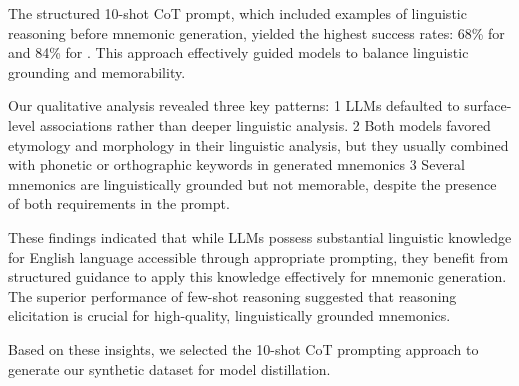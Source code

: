 The structured 10-shot CoT prompt, which included examples of linguistic reasoning before mnemonic generation, yielded the highest success rates: 68\% for \xteachermodel and 84\% for \teachermodel. This approach effectively guided models to balance linguistic grounding and memorability.

Our qualitative analysis revealed three key patterns: \numlist{1} LLMs defaulted to surface-level associations rather than deeper linguistic analysis. \numlist{2} Both models favored etymology and morphology in their linguistic analysis, but they usually combined with phonetic or orthographic keywords in generated mnemonics \numlist{3} Several mnemonics are linguistically grounded but not memorable, despite the presence of both requirements in the prompt.

These findings indicated that while LLMs possess substantial linguistic knowledge for English language accessible through appropriate prompting, they benefit from structured guidance to apply this knowledge effectively for mnemonic generation. The superior performance of few-shot reasoning suggested that reasoning elicitation is crucial for high-quality, linguistically grounded mnemonics.

Based on these insights, we selected the 10-shot CoT prompting approach to generate our synthetic dataset for model distillation.
